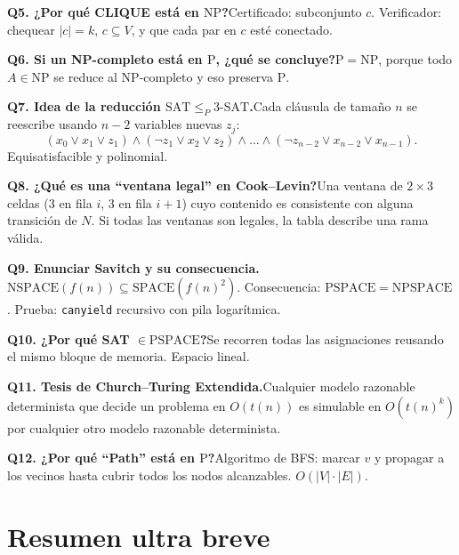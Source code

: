 \documentclass[11pt,a4paper]{article}
\theoremstyle{definicion}
\newcommand{\redP}{\leq_{P}}
\newcommand{\NP}{\mathrm{NP}}
\newcommand{\Pclass}{\mathrm{P}}
\newcommand{\SPACE}{\mathrm{SPACE}}
\newcommand{\NSPACE}{\mathrm{NSPACE}}
\newcommand{\PSPACE}{\mathrm{PSPACE}}
\newcommand{\NPSPACE}{\mathrm{NPSPACE}}
\begin{document}
\textbf{Q5. ¿Por qu\'e CLIQUE est\'a en $\NP$?}\quad Certificado: subconjunto $c$. Verificador: chequear $|c| = k$, $c \subseteq V$, y que cada par en $c$ est\'e conectado.

\textbf{Q6. Si un NP-completo est\'a en $\Pclass$, ¿qu\'e se concluye?}\quad $\Pclass = \NP$, porque todo $A \in \NP$ se reduce al NP-completo y eso preserva $\Pclass$.

\textbf{Q7. Idea de la reducci\'on $\mathrm{SAT} \redP \mathrm{3\text{-}SAT}$.}\quad Cada cl\'ausula de tama\~no $n$ se reescribe usando $n-2$ variables nuevas $z_j$:
\[
(x_0 \lor x_1 \lor z_1) \land (\neg z_1 \lor x_2 \lor z_2) \land \dots \land (\neg z_{n-2} \lor x_{n-2} \lor x_{n-1}).
\]
Equisatisfacible y polinomial.

\textbf{Q8. ¿Qu\'e es una ``ventana legal'' en Cook--Levin?}\quad Una ventana de $2 \times 3$ celdas (3 en fila $i$, 3 en fila $i+1$) cuyo contenido es consistente con alguna transici\'on de $N$. Si todas las ventanas son legales, la tabla describe una rama v\'alida.

\textbf{Q9. Enunciar Savitch y su consecuencia.}\quad $\NSPACE(f(n)) \subseteq \SPACE(f(n)^2)$. Consecuencia: $\PSPACE = \NPSPACE$. Prueba: \texttt{canyield} recursivo con pila logar\'itmica.

\textbf{Q10. ¿Por qu\'e SAT $\in \PSPACE$?}\quad Se recorren todas las asignaciones reusando el mismo bloque de memoria. Espacio lineal.

\textbf{Q11. Tesis de Church--Turing Extendida.}\quad Cualquier modelo razonable determinista que decide un problema en $O(t(n))$ es simulable en $O(t(n)^k)$ por cualquier otro modelo razonable determinista.

\textbf{Q12. ¿Por qu\'e ``Path'' est\'a en $\Pclass$?}\quad Algoritmo de BFS: marcar $v$ y propagar a los vecinos hasta cubrir todos los nodos alcanzables. $O(|V| \cdot |E|)$.

\section{Resumen ultra breve}
\end{document}
